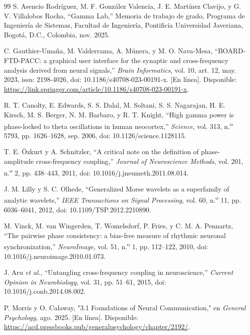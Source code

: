 \documentclass[12pt,letterpaper,oneside]{article}
\begin{document}
\begin{thebibliography}{99}
S. Asencio Rodríguez, M. F. González Valencia, J. E. Martínez Clavijo, y G. V. Villalobos Rocha, ``Gamma Lab,'' Memoria de trabajo de grado, Programa de Ingeniería de Sistemas, Facultad de Ingeniería, Pontificia Universidad Javeriana, Bogotá, D.C., Colombia, nov. 2025.

C. Gauthier-Umaña, M. Valderrama, A. Múnera, y M. O. Nava-Mesa, ``BOARD-FTD-PACC: a graphical user interface for the synaptic and cross-frequency analysis derived from neural signals,'' \textit{Brain Informatics}, vol. 10, art. 12, may. 2023, issn: 2198-4026, doi: 10.1186/s40708-023-00191-x. [En línea]. Disponible: \url{https://link.springer.com/article/10.1186/s40708-023-00191-x}.

R. T. Canolty, E. Edwards, S. S. Dalal, M. Soltani, S. S. Nagarajan, H. E. Kirsch, M. S. Berger, N. M. Barbaro, y R. T. Knight, ``High gamma power is phase-locked to theta oscillations in human neocortex,'' \textit{Science}, vol. 313, n.\textsuperscript{o} 5793, pp. 1626--1628, sep. 2006, doi: 10.1126/science.1128115.

T. E. Özkurt y A. Schnitzler, ``A critical note on the definition of phase-amplitude cross-frequency coupling,'' \textit{Journal of Neuroscience Methods}, vol. 201, n.\textsuperscript{o} 2, pp. 438--443, 2011, doi: 10.1016/j.jneumeth.2011.08.014.

J. M. Lilly y S. C. Olhede, ``Generalized Morse wavelets as a superfamily of analytic wavelets,'' \textit{IEEE Transactions on Signal Processing}, vol. 60, n.\textsuperscript{o} 11, pp. 6036--6041, 2012, doi: 10.1109/TSP.2012.2210890.

M. Vinck, M. van Wingerden, T. Womelsdorf, P. Fries, y C. M. A. Pennartz, ``The pairwise phase consistency: a bias-free measure of rhythmic neuronal synchronization,'' \textit{NeuroImage}, vol. 51, n.\textsuperscript{o} 1, pp. 112--122, 2010, doi: 10.1016/j.neuroimage.2010.01.073.

J. Aru \textit{et al.}, ``Untangling cross-frequency coupling in neuroscience,'' \textit{Current Opinion in Neurobiology}, vol. 31, pp. 51--61, 2015, doi: 10.1016/j.conb.2014.08.002.

 P. Morris y O. Calaway, "3.1 Foundations of Neural Communication," en \textit{General Psychology}, ago. 2025. [En línea]. Disponible: \url{https://acd.pressbooks.pub/generalpsychology/chapter/2192/}.


\end{thebibliography}
\end{document}
